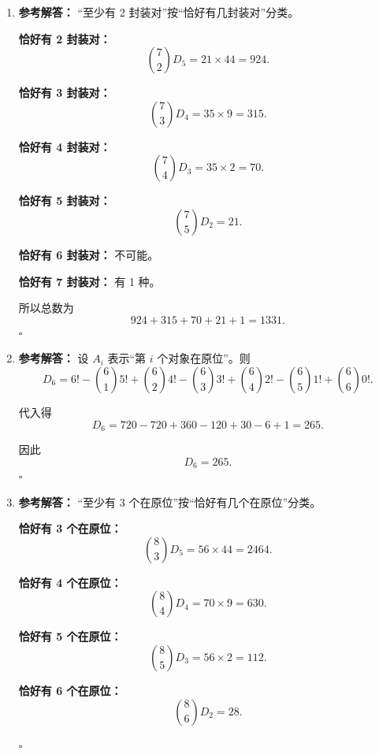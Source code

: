\documentclass[11pt,a4paper,fontset=fandol]{ctexart}
\newenvironment{solution}{\par\noindent\textbf{参考解答：}}{\hfill$\square$\par}
\begin{document}
\begin{enumerate}
\begin{solution}
  三个坏事件同时发生共有
  \[
  \binom63 5!=20\times 120=2400
  \]
  种。

  四个坏事件同时发生共有
  \[
  \binom64 4!=15\times 24=360
  \]
  种。

  五个坏事件同时发生共有
  \[
  \binom65 3!=6\times 6=36
  \]
  种。

  六个坏事件同时发生共有
  \[
  \binom66 2!=2
  \]
  种。

  所以所求为
  \[
  40320-30240+10800-2400+360-36+2=18806.
  \]
  \end{solution}

  \item \begin{solution}
  “至少有 2 封装对”按“恰好有几封装对”分类。

  \textbf{恰好有 2 封装对：}
  \[
  \binom72 D_5=21\times 44=924.
  \]

  \textbf{恰好有 3 封装对：}
  \[
  \binom73 D_4=35\times 9=315.
  \]

  \textbf{恰好有 4 封装对：}
  \[
  \binom74 D_3=35\times 2=70.
  \]

  \textbf{恰好有 5 封装对：}
  \[
  \binom75 D_2=21.
  \]

  \textbf{恰好有 6 封装对：}
  不可能。

  \textbf{恰好有 7 封装对：}
  有 1 种。

  所以总数为
  \[
  924+315+70+21+1=1331.
  \]
  \end{solution}

  \item \begin{solution}
  设 $A_i$ 表示“第 $i$ 个对象在原位”。则
  \[
  D_6=6!-\binom61 5!+\binom62 4!-\binom63 3!+\binom64 2!-\binom65 1!+\binom66 0!.
  \]

  代入得
  \[
  D_6=720-720+360-120+30-6+1=265.
  \]

  因此
  \[
  D_6=265.
  \]
  \end{solution}

  \item \begin{solution}
  “至少有 3 个在原位”按“恰好有几个在原位”分类。

  \textbf{恰好有 3 个在原位：}
  \[
  \binom83 D_5=56\times 44=2464.
  \]

  \textbf{恰好有 4 个在原位：}
  \[
  \binom84 D_4=70\times 9=630.
  \]

  \textbf{恰好有 5 个在原位：}
  \[
  \binom85 D_3=56\times 2=112.
  \]

  \textbf{恰好有 6 个在原位：}
  \[
  \binom86 D_2=28.
  \]


\end{solution}
\end{enumerate}
\end{document}
